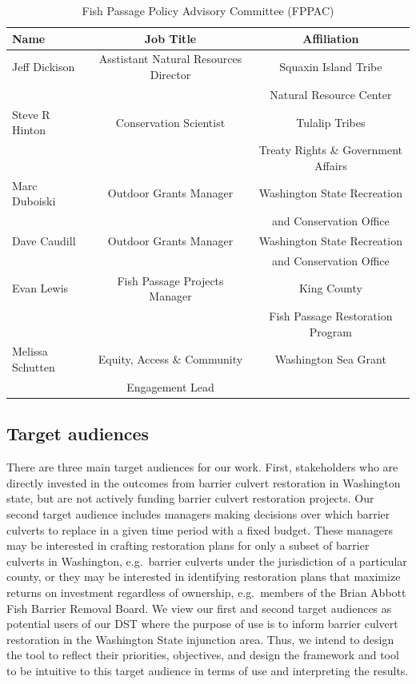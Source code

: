 \documentclass[12pt]{elsarticle}
\begin{document}
\begin{table}[h]
\caption{Fish Passage Policy Advisory Committee (FPPAC) \label{tab:sab}}
\centering
\begin{tabular}{lcc}\hline
 Name & Job Title & Affiliation  \\\hline
Jeff Dickison& Asstistant Natural Resources Director &  Squaxin Island Tribe\\
& & Natural Resource Center\\
\rowcolor[gray]{.9} Steve R Hinton &  Conservation Scientist&  Tulalip Tribes  \\
\rowcolor[gray]{.9}& &Treaty Rights \& Government Affairs\\
Marc Duboiski & Outdoor Grants Manager & Washington State Recreation\\
& & and Conservation Office\\
\rowcolor[gray]{.9}Dave Caudill & Outdoor Grants Manager & Washington State Recreation\\
\rowcolor[gray]{.9}& & and Conservation Office\\
Evan Lewis &  Fish Passage Projects Manager&  King County  \\
& & Fish Passage Restoration Program\\
\rowcolor[gray]{.9}Melissa Schutten & Equity, Access \& Community  & Washington Sea Grant \\
\rowcolor[gray]{.9}& Engagement Lead & \\
\hline
\end{tabular}
\end{table}


\subsection*{Target audiences}

There are three main target audiences for our work. First, stakeholders who are directly invested in the outcomes from barrier culvert restoration in Washington state, but are not actively funding barrier culvert restoration projects. Our second target audience includes managers making decisions over which barrier culverts to replace in a given time period with a fixed budget. These managers may be interested in crafting restoration plans for only a subset of barrier culverts in Washington, e.g.\ barrier culverts under the jurisdiction of a particular county, or they may be interested in identifying restoration plans that maximize returns on investment regardless of ownership, e.g.\ members of the Brian Abbott Fish Barrier Removal Board. We view our first and second target audiences as potential users of our DST where the purpose of use is to inform barrier culvert restoration in the Washington State injunction area. Thus, we intend to design the tool to reflect their priorities, objectives, and design the framework and tool to be intuitive to this target audience in terms of use and interpreting the results.
\end{document}
